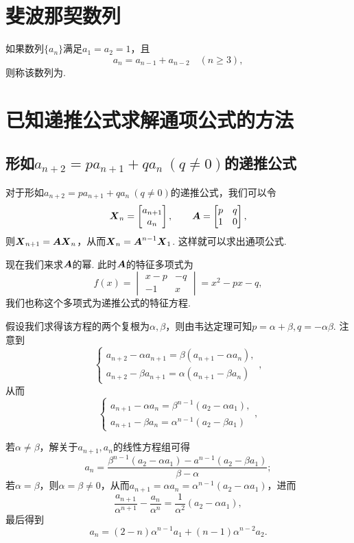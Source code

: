 \section{斐波那契数列}
如果数列\(\{a_n\}\)满足\(a_1=a_2=1\)，且\[
a_n = a_{n-1} + a_{n-2} \quad(n\geq3),
\]则称该数列为.

\section{已知递推公式求解通项公式的方法}
\subsection{\texorpdfstring{形如\(a_{n+2}=p a_{n+1} + q a_n\ (q\neq0)\)的递推公式}{第一类递推公式}}
对于形如\(a_{n+2}=p a_{n+1} + q a_n\ (q\neq0)\)的递推公式，我们可以令\[
\boldsymbol{X}_n = \begin{bmatrix}
a_{n+1} \\
a_n
\end{bmatrix},
\qquad
\boldsymbol{A} = \begin{bmatrix}
p & q \\
1 & 0
\end{bmatrix},
\]则\(\boldsymbol{X}_{n+1} = \boldsymbol{A} \boldsymbol{X}_n\)，从而\(\boldsymbol{X}_n = \boldsymbol{A}^{n-1} \boldsymbol{X}_1\).
这样就可以求出通项公式.

现在我们来求\(\boldsymbol{A}\)的幂.
此时\(\boldsymbol{A}\)的特征多项式为\[
f(x) = \begin{vmatrix}
x-p & -q \\
-1 & x
\end{vmatrix} = x^2 - px - q,
\]我们也称这个多项式为递推公式的特征方程.

假设我们求得该方程的两个复根为\(\alpha,\beta\)，则由韦达定理可知\(p=\alpha+\beta, q=-\alpha\beta\).
注意到\[
\left\{ \begin{array}{l}
a_{n+2} - \alpha a_{n+1} = \beta(a_{n+1}-\alpha a_n), \\
a_{n+2} - \beta a_{n+1} = \alpha(a_{n+1}-\beta a_n)
\end{array} \right.,
\]从而\[
\left\{ \begin{array}{l}
a_{n+1} - \alpha a_n = \beta^{n-1} (a_2 - \alpha a_1), \\
a_{n+1} - \beta a_n = \alpha^{n-1} (a_2 - \beta a_1)
\end{array} \right.,
\]

若\(\alpha\neq\beta\)，解关于\(a_{n+1},a_n\)的线性方程组可得\[
a_n = \frac{\beta^{n-1} (a_2 - \alpha a_1) - a^{n-1} (a_2 - \beta a_1)}{\beta-\alpha};
\]
若\(\alpha=\beta\)，则\(\alpha=\beta\neq0\)，从而\(a_{n+1} = \alpha a_n = \alpha^{n-1} (a_2 - \alpha a_1)\)，进而\[
\frac{a_{n+1}}{\alpha^{n+1}} - \frac{a_n}{\alpha^n} = \frac{1}{\alpha^2}(a_2-\alpha a_1),
\]最后得到\[
a_n = (2-n)\alpha^{n-1} a_1 + (n-1) \alpha^{n-2} a_2.
\]

